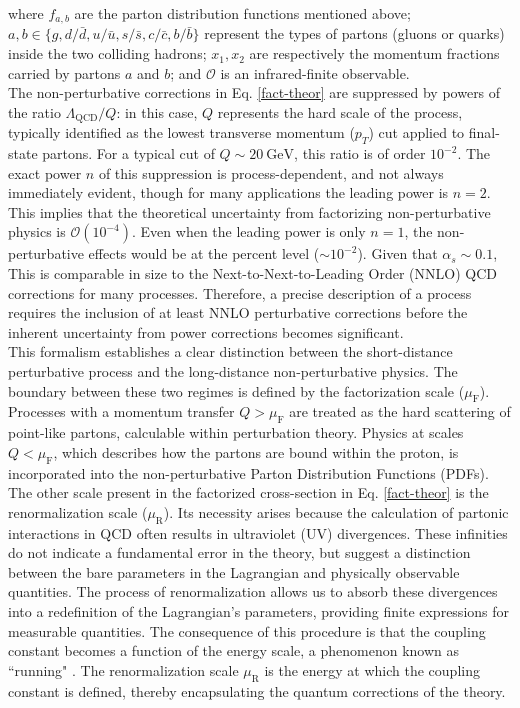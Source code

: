 \documentclass[a4paper, 12pt]{book}
\begin{document}
where $f_{a,b}$ are the parton distribution functions mentioned above; $a, b \in \{g, d/\bar{d}, u/\bar{u}, s/\bar{s}, c/\bar{c}, b/\bar{b} \}$  represent the types of partons (gluons or quarks) inside the two colliding hadrons; $x_1, x_2$ are respectively the momentum fractions carried by partons $a$ and $b$; and $\mathcal{O}$ is an infrared-finite observable. \\
The non-perturbative corrections in Eq. \ref{fact-theor} are suppressed by powers of the ratio $\Lambda_{\text{QCD}}/Q$: in this case, $Q$ represents the hard scale of the process, typically identified as the lowest transverse momentum ($p_T$) cut applied to final-state partons. For a typical cut of $Q \sim 20\ \text{GeV}$, this ratio is of order $10^{-2}$. The exact power $n$ of this suppression is process-dependent, and not always immediately evident, though for many applications the leading power is $n = 2$. This implies that the theoretical uncertainty from factorizing non-perturbative physics is $\mathcal{O}(10^{-4})$. Even when the leading power is only $n = 1$, the non-perturbative effects would be at the percent level ($\sim 10^{-2}$). Given that $\alpha_s \sim0.1$, This is comparable in size to the Next-to-Next-to-Leading Order (NNLO) QCD corrections for many processes. Therefore, a precise description of a process requires the inclusion of at least NNLO perturbative corrections before the inherent uncertainty from power corrections becomes significant.\\
This formalism establishes a clear distinction between the short-distance perturbative process and the long-distance non-perturbative physics. The boundary between these two regimes is defined by the factorization scale ($\mu_\text{F}$). Processes with a momentum transfer $Q > \mu_\text{F}$ are treated as the hard scattering of point-like partons, calculable within perturbation theory. Physics at scales $Q < \mu_\text{F}$, which describes how the partons are bound within the proton, is incorporated into the non-perturbative Parton Distribution Functions (PDFs). \\
The other scale present in the factorized cross-section in Eq. \ref{fact-theor} is the renormalization scale ($\mu_\text{R}$). Its necessity arises because the calculation of partonic interactions in QCD often results in ultraviolet (UV) divergences. These infinities do not indicate a fundamental error in the theory, but suggest a distinction between the bare parameters in the Lagrangian and physically observable quantities. The process of renormalization allows us to absorb these divergences into a redefinition of the Lagrangian's parameters, providing finite expressions for measurable quantities. The consequence of this procedure is that the coupling constant becomes a function of the energy scale, a phenomenon known as ``running" \cite{ellis}. The renormalization scale $\mu_\text{R}$ is the energy at which the coupling constant is defined, thereby encapsulating the quantum corrections of the theory. \\
\end{document}
